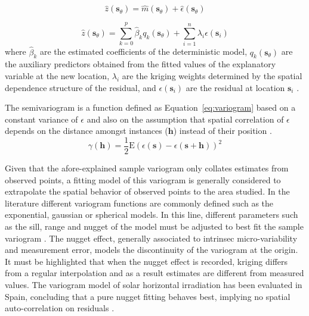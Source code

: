 \documentclass[article]{jss}
\begin{document}
\begin{equation}
  \label{eq:externalDrift}
  \hat{z}(\mathbf{\mathbf{s}}_\theta) = \hat{m}(\mathbf{s}_\theta) + \hat{\epsilon}(\mathbf{s}_\theta)
\end{equation}

\begin{equation}
  \label{eq:externalDrift_sum}
  \hat{z}(\mathbf{s}_\theta) =  \sum_{k=0}^p \hat{\beta}_k q_k(\mathbf{s}_\theta) + 
  \sum_{i=1}^n \lambda_i \epsilon(\mathbf{s}_i)
\end{equation}
where $\hat{\beta}_k$ are the estimated coefficients of the
deterministic model, $q_k(\mathbf{s}_\theta)$ are the auxiliary
predictors obtained from the fitted values of the explanatory
variable at the new location, $\lambda_i$ are the kriging weights
determined by the spatial dependence structure of the residual,
and $\epsilon(\mathbf{s}_i)$ are the residual at location
$\mathbf{s}_i$ \citep{Antonanzas-Torres.Canizares.ea2013}.

The semivariogram is a function defined as
Equation~\ref{eq:variogram} based on a constant variance of
$\epsilon$ and also on the assumption that spatial correlation of
$\epsilon$ depends on the distance amongst instances
($\mathbf{h}$) instead of their position
\citep{Pebesma2004}.
\begin{equation}
  \label{eq:variogram}
  \gamma(\mathbf{h}) = \frac{1}{2} \textrm{E}(\epsilon(\mathbf{s}) -
  \epsilon(\mathbf{s} + \mathbf{h}))^2
\end{equation}

Given that the afore-explained sample variogram only collates
estimates from observed points, a fitting model of this variogram
is generally considered to extrapolate the spatial behavior of
observed points to the area studied.  In the literature different
variogram functions are commonly defined such as the exponential,
gaussian or spherical models. In this line, different parameters
such as the sill, range and nugget of the model must be adjusted
to best fit the sample variogram \citep{Hengl2009}. The nugget
effect, generally associated to intrinsec micro-variability and
measurement error, models the discontinuity of the variogram at
the origin. It must be highlighted that when the nugget effect is
recorded, kriging differs from a regular interpolation and as a
result estimates are different from measured values. The variogram
model of solar horizontal irradiation has been evaluated in Spain,
concluding that a pure nugget fitting behaves best, implying no
spatial auto-correlation on residuals
\citep{Antonanzas-Torres.Canizares.ea2013}.
\end{document}

